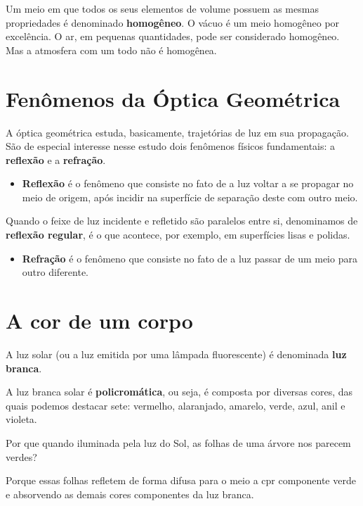 \documentclass[11pt,twocolumn,oneside]{article}
\begin{document}
Um meio em que todos os seus elementos de volume possuem as mesmas propriedades é denominado \textbf{homogêneo}. O vácuo é um meio homogêneo por excelência. O ar, em pequenas quantidades, pode ser considerado homogêneo. Mas a atmosfera com um todo não é homogênea.


\hypertarget{x-fenômenos-da-óptica-geométrica}{\section{Fenômenos da Óptica Geométrica}}
A óptica geométrica estuda, basicamente, trajetórias de luz em sua propagação. São de especial interesse nesse estudo dois fenômenos físicos fundamentais: a \textbf{reflexão} e a \textbf{refração}.


\begin{itemize}

\item \textbf{Reflexão} é o fenômeno que consiste no fato de a luz voltar a se propagar no meio de origem, após incidir na superfície de separação deste com outro meio.

\end{itemize}


Quando o feixe de luz incidente e refletido são paralelos entre si, denominamos de \textbf{reflexão regular}, é o que acontece, por exemplo, em superfícies lisas e polidas.


\begin{itemize}

\item \textbf{Refração} é o fenômeno que consiste no fato de a luz passar de um meio para outro diferente.

\end{itemize}


\hypertarget{x-a-cor-de-um-corpo}{\section{A cor de um corpo}}
A luz solar (ou a luz emitida por uma lâmpada fluorescente) é denominada \textbf{luz branca}.


A luz branca solar é \textbf{policromática}, ou seja, é composta por diversas cores, das quais podemos destacar sete: vermelho, alaranjado, amarelo, verde, azul, anil e violeta.


Por que quando iluminada pela luz do Sol, as folhas de uma árvore nos parecem verdes?


Porque essas folhas refletem de forma difusa para o meio a cpr componente verde e absorvendo as demais cores componentes da luz branca.
\end{document}
